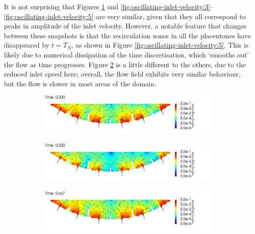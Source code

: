         It is not surprising that Figures \ref{fig:oscillating-inlet-velocity:1} and \ref{fig:oscillating-inlet-velocity:3}--\ref{fig:oscillating-inlet-velocity:5} are very similar, given that they all correspond to peaks in amplitude of the inlet velocity. However, a notable feature that changes between these snapshots is that the recirculation zones in all the placentones have disappeared by $t = T_N$, as shown in Figure \ref{fig:oscillating-inlet-velocity:5}. This is likely due to numerical dissipation of the time discretisation, which `smooths out' the flow as time progresses. Figure \ref{fig:oscillating-inlet-velocity:2} is a little different to the others, due to the reduced inlet speed here; overall, the flow field exhibits very similar behaviour, but the flow is slower in most areas of the domain. 

        \begin{figure}
            \centering
            \begin{subfigure}{\textwidth}
                \includegraphics[width=\textwidth]{diagrams/results-modelling/velocity-transport-oscillating/placenta-velocity/velocity.0000.png}
                \caption{}
                \label{fig:oscillating-inlet-velocity:1}
            \end{subfigure}
            \begin{subfigure}{\textwidth}
                \includegraphics[width=\textwidth]{diagrams/results-modelling/velocity-transport-oscillating/placenta-velocity/velocity.0015.png}
                \caption{}
                \label{fig:oscillating-inlet-velocity:2}
            \end{subfigure}
            \begin{subfigure}{\textwidth}
                \includegraphics[width=\textwidth]{diagrams/results-modelling/velocity-transport-oscillating/placenta-velocity/velocity.0020.png}

\end{subfigure}
\end{figure}
